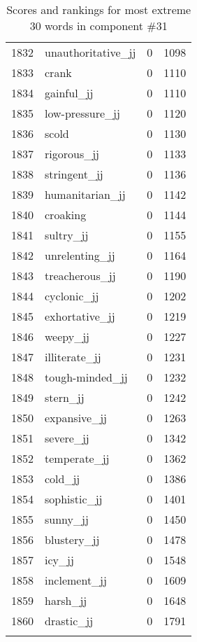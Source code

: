 \begin{longtable}[!htbp]{| rlr@{.}l |}
    1832 & unauthoritative\_jj & 0 & 1098 \\
    1833 & crank & 0 & 1110 \\
    1834 & gainful\_jj & 0 & 1110 \\
    1835 & low-pressure\_jj & 0 & 1120 \\
    1836 & scold & 0 & 1130 \\
    1837 & rigorous\_jj & 0 & 1133 \\
    1838 & stringent\_jj & 0 & 1136 \\
    1839 & humanitarian\_jj & 0 & 1142 \\
    1840 & croaking & 0 & 1144 \\
    1841 & sultry\_jj & 0 & 1155 \\
    1842 & unrelenting\_jj & 0 & 1164 \\
    1843 & treacherous\_jj & 0 & 1190 \\
    1844 & cyclonic\_jj & 0 & 1202 \\
    1845 & exhortative\_jj & 0 & 1219 \\
    1846 & weepy\_jj & 0 & 1227 \\
    1847 & illiterate\_jj & 0 & 1231 \\
    1848 & tough-minded\_jj & 0 & 1232 \\
    1849 & stern\_jj & 0 & 1242 \\
    1850 & expansive\_jj & 0 & 1263 \\
    1851 & severe\_jj & 0 & 1342 \\
    1852 & temperate\_jj & 0 & 1362 \\
    1853 & cold\_jj & 0 & 1386 \\
    1854 & sophistic\_jj & 0 & 1401 \\
    1855 & sunny\_jj & 0 & 1450 \\
    1856 & blustery\_jj & 0 & 1478 \\
    1857 & icy\_jj & 0 & 1548 \\
    1858 & inclement\_jj & 0 & 1609 \\
    1859 & harsh\_jj & 0 & 1648 \\
    1860 & drastic\_jj & 0 & 1791 \\
    \hline
    \caption{Scores and rankings for most extreme 30 words in component \#31} \\
\end{longtable}
